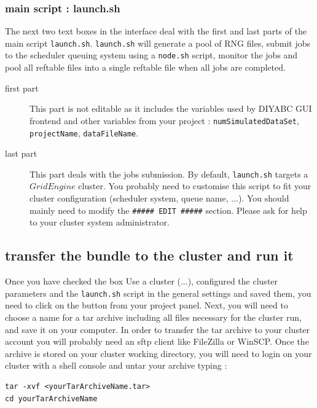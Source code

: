 \subsubsection{main script : launch.sh}
The next two text boxes in the interface deal with the first and last parts of the main script \texttt{launch.sh}. \texttt{launch.sh} will generate a pool of RNG files, submit jobs to the scheduler queuing system using a \texttt{node.sh} script, monitor the jobs and pool all reftable files into a single reftable file when all jobs are completed.

\begin{description}
	\item[first part] This part is not editable as it includes the variables used by DIYABC GUI frontend and other variables from your project : \texttt{numSimulatedDataSet}, \texttt{projectName}, \texttt{dataFileName}. 
	
	\item[last part] This part deals with the jobs submission. By default, \texttt{launch.sh} targets a $Grid Engine$ cluster. You probably need to customise this script to fit your cluster configuration (scheduler system, queue name, ...). You should mainly need to modify the  \texttt{\#\#\#\#\# EDIT \#\#\#\#\#} section. Please ask for help to your cluster system administrator.
\end{description}

\subsection{transfer the bundle to the cluster and run it}\label{clusterrun}
Once you have checked the box \textsf{Use a cluster (...)}, configured the cluster parameters and the \texttt{launch.sh} script in the general settings and saved them, you need to click on the  button from your project panel. Next, you will need to choose a name for a tar archive including all files necessary for the cluster run, and save it on your computer. In order to transfer the tar archive to your cluster account you will probably need an sftp client like FileZilla or WinSCP. Once the archive is stored on your cluster working directory, you will need to login on your cluster with a shell console and untar your archive typing :\\
   \begin{minipage}{0.9\textwidth}
\begin{lstlisting}
tar -xvf <yourTarArchiveName.tar>
cd yourTarArchiveName

\end{lstlisting}
   \end{minipage}

